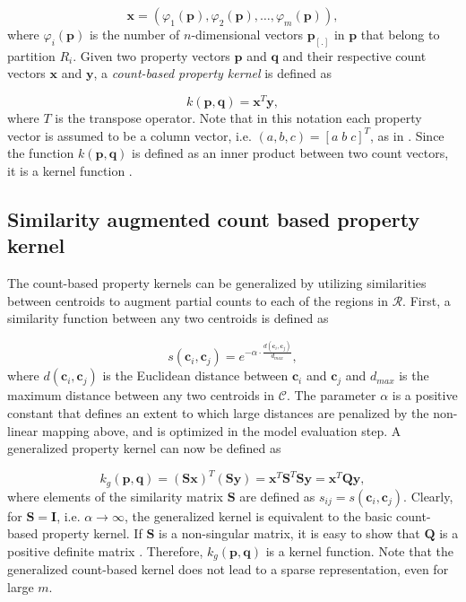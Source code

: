 \[
\mathbf{x}=\left(\varphi_{1}(\mathbf{p}),\varphi_{2}(\mathbf{p}),\ldots,\varphi_{m}(\mathbf{p})\right),
\]
where $\varphi_{i}(\mathbf{p})$ is the number of $n$-dimensional vectors $\mathbf{p}_{[.]}$ in $\mathbf{p}$ that belong to partition $R_{i}$. Given two property vectors $\mathbf{p}$ and $\mathbf{q}$ and their respective count vectors $\mathbf{x}$ and $\mathbf{y}$, a \textit{count-based property kernel} is defined as

\[
k(\mathbf{p},\mathbf{q})=\mathbf{x}^{T}\mathbf{y},
\]
where $T$ is the transpose operator. Note that in this notation each property vector is assumed to be a column vector, i.e. $\left(a,b,c\right)=\left[a\; b\; c\right]^{T}$, as in \citet{strang2003introduction}. Since the function $k(\mathbf{p},\mathbf{q})$ is defined as an inner product between two count vectors, it is a kernel function \citep{Haussler1999}.

\subsection{Similarity augmented count based property kernel}
\label{sec:distancekernel}

The count-based property kernels can be generalized by utilizing similarities between centroids to augment partial counts to each of the regions in $\mathcal{R}$. First, a
similarity function between any two centroids is defined as 

\[
s(\mathbf{c}_{i},\mathbf{c}_{j})=e^{-\alpha\cdot\frac{d(\mathbf{c}_{i},\mathbf{c}_{j})}{d_{max}}},
\]
where $d(\mathbf{c}_{i},\mathbf{c}_{j})$ is the Euclidean distance between $\mathbf{c}_{i}$ and $\mathbf{c}_{j}$ and $d_{max}$ is the maximum distance between any two centroids in $\mathcal{C}$. The parameter $\alpha$ is a positive constant that defines an extent to which large distances are penalized by the non-linear mapping above, and is optimized in the model evaluation step. A generalized property kernel can now be defined as

\[
k_{g}(\mathbf{p},\mathbf{q})=(\mathbf{Sx})^{T}(\mathbf{Sy})=\mathbf{x}^{T}\mathbf{S}^{T}\mathbf{S}\mathbf{y}=\mathbf{x}^{T}\mathbf{Q}\mathbf{y},
\]
where elements of the similarity matrix $\mathbf{S}$ are defined as $s_{ij}=s(\mathbf{c}_{i},\mathbf{c}_{j})$. Clearly, for $\mathbf{S}=\mathbf{I}$, i.e. $\alpha\rightarrow\infty$, the generalized kernel is equivalent to the basic count-based property kernel. If \textbf{$\mathbf{S}$} is a non-singular matrix, it is easy to show that $\mathbf{Q}$ is a positive definite matrix \citep{strang2003introduction}. Therefore, $k_{g}(\mathbf{p},\mathbf{q})$ is a kernel function. Note that the generalized count-based kernel does not lead to a sparse representation, even for large $m$. 



